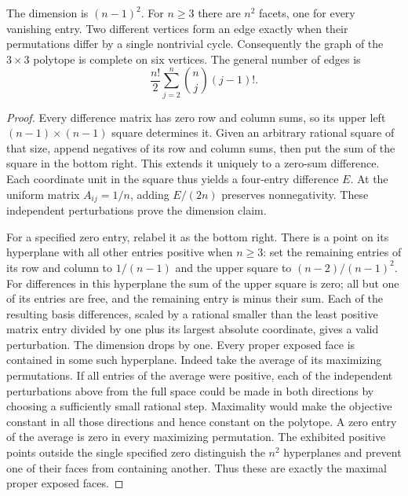 \begin{proposition}\label{result55}
The dimension is \((n-1)^2\). For \(n\ge3\) there are \(n^2\) facets,
one for every vanishing entry. Two different vertices form an edge
exactly when their permutations differ by a single nontrivial cycle.
Consequently the graph of the \(3\times3\) polytope is complete on six
vertices. The general number of edges is
\[
 \frac{n!}{2}\sum_{j=2}^n\binom nj(j-1)!.
\]
\end{proposition}
\begin{proof}
Every difference matrix has zero row and column sums, so its upper
left \((n-1)\times(n-1)\) square determines it. Given an arbitrary
rational square of that size, append negatives of its row and column
sums, then put the sum of the square in the bottom right. This
extends it uniquely to a zero-sum difference. Each coordinate unit
in the square thus yields a four-entry difference \(E\). At the uniform
matrix \(A_{ij}=1/n\), adding \(E/(2n)\) preserves nonnegativity.
These independent perturbations prove the dimension claim.

For a specified zero entry, relabel it as the bottom right. There is a
point on its hyperplane with all other entries positive when \(n\ge3\):
set the remaining entries of its row and column to \(1/(n-1)\) and the
upper square to \((n-2)/(n-1)^2\). For differences in this hyperplane
the sum of the upper square is zero; all but one of its entries are
free, and the remaining entry is minus their sum. Each of the resulting
basis differences, scaled by a rational smaller than the least positive
matrix entry divided by one plus its largest absolute coordinate, gives
a valid perturbation. The dimension drops by one. Every proper exposed
face is contained in some such hyperplane. Indeed take the average of
its maximizing permutations. If all entries of the average were positive,
each of the independent perturbations above from the full space could
be made in both directions by choosing a sufficiently small rational
step. Maximality would make the objective constant in all those directions
and hence constant on the polytope. A zero entry of the average is zero
in every maximizing permutation. The exhibited positive points outside
the single specified zero distinguish the \(n^2\) hyperplanes and prevent
one of their faces from containing another. Thus these are exactly the
maximal proper exposed faces.


\end{proof}
